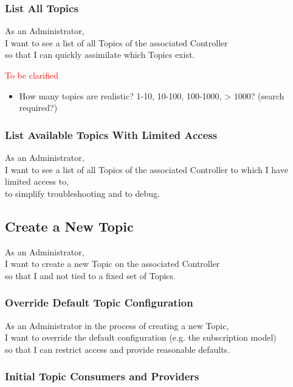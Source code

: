 \subsubsection{List All Topics}
As an Administrator,\\
I want to see a list of all Topics of the associated Controller\\
so that I can quickly assimilate which Topics exist.

\noindent\textcolor{red}{To be clarified}

\begin{itemize}
    \item How many topics are realistic? 1-10, 10-100, 100-1000, > 1000? (search required?)
\end{itemize}


\subsubsection{List Available Topics With Limited Access}

As an Administrator,\\
I want to see a list of all Topics of the associated Controller to which I have limited access to,\\
to simplify troubleshooting and to debug.

\subsection{Create a New Topic}

As an Administrator,\\
I want to create a new Topic on the associated Controller\\
so that I and not tied to a fixed set of Topics.

\subsubsection{Override Default Topic Configuration}

As an Administrator in the process of creating a new Topic,\\
I want to override the default configuration (e.g. the subscription model) \\
so that I can restrict access and provide reasonable defaults.

\subsubsection{Initial Topic Consumers and Providers}

